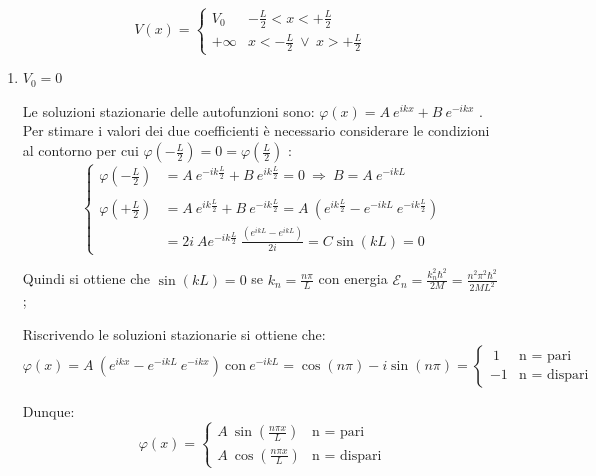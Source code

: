 \documentclass[12pt,twoside,a4]{article}
\begin{document}
\begin{solution}
\begin{equation*}
   V(x) = \begin{cases}
    V_0  & -\frac{L}{2} < x < + \frac{L}{2} \\
    + \infty  & x < - \frac{L}{2} \ \lor \ x > + \frac{L}{2}
    \end{cases}
\end{equation*}

\begin{enumerate}[label=(\textit{\roman*})]
\item
$V_0 = 0$

Le soluzioni stazionarie delle autofunzioni sono: $\varphi(x) = A \ e^{ikx} + B \ e^{-ikx}$ . Per stimare i valori dei due coefficienti è necessario considerare le condizioni al contorno per cui $\varphi(-\frac{L}{2}) = 0 = \varphi(\frac{L}{2})$ : 
\begin{equation*}
\begin{cases}
    \varphi \left(- \frac{L}{2} \right) 
    &= A \ e^{-ik\frac{L}{2}} + B \ e^{ik\frac{L}{2}} = 0  \  \Rightarrow  \  B = A \ e^{-ikL}  \\
    \\

    \varphi \left(+ \frac{L}{2} \right) 
    & = A \ e^{ik\frac{L}{2}} + B \ e^{-ik\frac{L}{2}} = A \ \left(e^{ik\frac{L}{2}} - e^{-ikL} \ e^{-ik\frac{L}{2}} \right)  \\
    & =  2i \ A e^{-ik\frac{L}{2}} \ \frac{(e^{ikL} - e^{ikL})}{2i} = C \sin{(kL)} = 0
    \end{cases}
\end{equation*}

Quindi si ottiene che $\sin{(kL)} = 0$ se $k_n = \frac{n \pi}{L}$ con energia $\mathcal{E}_n = \frac{k_n^2 \hbar^2}{2 M} = \frac{n^2 \pi^2 \hbar^2}{ 2 M L^2}$ ;

Riscrivendo le soluzioni stazionarie si ottiene che: 
\begin{equation*}
\varphi(x) = A \ \left(e^{ikx} - e^{-ikL} \ e^{-ikx} \right)   \  \text{con}  \  e^{-ikL} = \cos{(n \pi)} - i \sin{(n \pi)} = \begin{cases}
    \ 1  &  \text{n = pari} \\
    -1  &  \text{n = dispari}
\end{cases}
\end{equation*}

Dunque: 
\begin{equation*}
\varphi(x) = \begin{cases}
    A \ \sin{(\frac{n \pi x }{L})}  &  \text{n = pari} \\
    A \ \cos{(\frac{n \pi x }{L})}  &  \text{n = dispari}
\end{cases}
\end{equation*}


\end{enumerate}
\end{solution}
\end{document}
